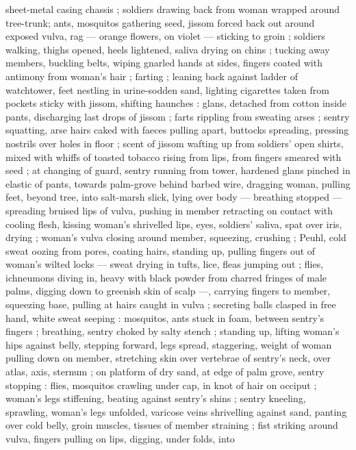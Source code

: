 \documentclass[10pt,twoside]{memoir}
\begin{document}
sheet-metal casing chassis ; soldiers drawing back from woman 
wrapped around tree-trunk; ants, mosquitos gathering seed, jissom 
forced back out around exposed vulva, rag --- orange flowers, on 
violet --- sticking to groin ; soldiers walking, thighs opened, heels 
lightened, saliva drying on chins ; tucking away members, buckling 
belts, wiping gnarled hands at sides, fingers coated with antimony 
from woman's hair ; farting ; leaning back against ladder of 
watchtower, feet nestling in urine-sodden sand, lighting cigarettes 
taken from pockets sticky with jissom, shifting haunches : glans, 
detached from cotton inside pants, discharging last drops of jissom 
; farts rippling from sweating arses ; sentry squatting, arse hairs 
caked with faeces pulling apart, buttocks spreading, pressing nostrils 
over holes in floor ; scent of jissom wafting up from soldiers' open 
shirts, mixed with whiffs of toasted tobacco rising from lips, from 
fingers smeared with seed ; at changing of guard, sentry running 
from tower, hardened glans pinched in elastic of pants, towards 
palm-grove behind barbed wire, dragging woman, pulling feet, 
beyond tree, into salt-marsh slick, lying over body --- breathing 
stopped --- spreading bruised lips of vulva, pushing in member 
retracting on contact with cooling flesh, kissing woman's shrivelled 
lips, eyes, soldiers' saliva, spat over iris, drying ; woman's vulva 
closing around member, squeezing, crushing ; Peuhl, cold sweat 
oozing from pores, coating hairs, standing up, pulling fingers out of 
woman's wilted locks --- sweat drying in tufts, lice, fleas jumping out 
; flies, ichneumons diving in, heavy with black powder from charred 
fringes of male palms, digging down to greenish skin of scalp ---, 
carrying fingers to member, squeezing base, pulling at hairs caught 
in vulva ; secreting balls clasped in free hand, white sweat seeping :
mosquitos, ants stuck in foam, between sentry's fingers ; breathing, 
sentry choked by salty stench ; standing up, lifting woman's hips 
against belly, stepping forward, legs spread, staggering, weight of 
woman pulling down on member, stretching skin over vertebrae of 
sentry's neck, over atlas, axis, sternum ; on platform of dry sand, at 
edge of palm grove, sentry stopping : flies, mosquitos crawling 
under cap, in knot of hair on occiput ; woman's legs stiffening, 
beating against sentry's shins ; sentry kneeling, sprawling, woman's 
legs unfolded, varicose veins shrivelling against sand, panting over 
cold belly, groin muscles, tissues of member straining ; fist striking 
around vulva, fingers pulling on lips, digging, under folds, into 
\end{document}
